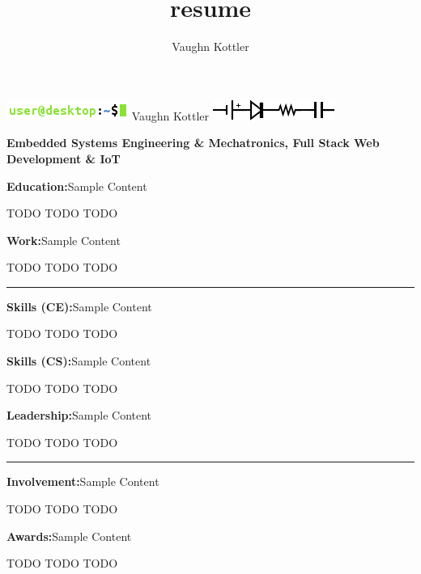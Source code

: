 \documentclass[letterpaper,10pt]{article}
\title{resume}
\author{Vaughn Kottler}
\begin{document}
\begin{center}\Huge
    \includegraphics{terminal.png} Vaughn Kottler \includegraphics{circuit.png}
\end{center}

\begin{center}\large
    \color{maroon}\textbf{
        Embedded Systems Engineering \& Mechatronics, Full Stack Web Development \& IoT
    }
\end{center}%

\noindent
\textbf{Education:}\hspace{2.6em}Sample Content
\begin{adjustwidth}{1.2in}{0in}
TODO\break
TODO\break
TODO\break
\end{adjustwidth}

\noindent
\textbf{Work:}\hspace{5.6em}Sample Content
\begin{adjustwidth}{1.2in}{0in}
TODO\break
TODO\break
TODO
\end{adjustwidth}

\begin{center}
\noindent\rule{7.75in}{0.5pt}
\end{center}

\noindent
\textbf{Skills (CE):}\hspace{1.4em}Sample Content
\begin{adjustwidth}{1.2in}{0in}
TODO\break
TODO\break
TODO\break
\end{adjustwidth}

\noindent
\textbf{Skills (CS):}\hspace{1.4em}Sample Content
\begin{adjustwidth}{1.2in}{0in}
TODO\break
TODO\break
TODO\break
\end{adjustwidth}

\noindent
\textbf{Leadership:}\hspace{2em}Sample Content
\begin{adjustwidth}{1.2in}{0in}
TODO\break
TODO\break
TODO
\end{adjustwidth}

\begin{center}
\noindent\rule{7.75in}{0.5pt}
\end{center}

\noindent
\textbf{Involvement:}\hspace{1.35em}Sample Content
\begin{adjustwidth}{1.2in}{0in}
TODO\break
TODO\break
TODO\break
\end{adjustwidth}

\noindent
\textbf{Awards:}\hspace{4.4em}Sample Content
\begin{adjustwidth}{1.2in}{0in}
TODO\break
TODO\break
TODO
\end{adjustwidth}
\end{document}
